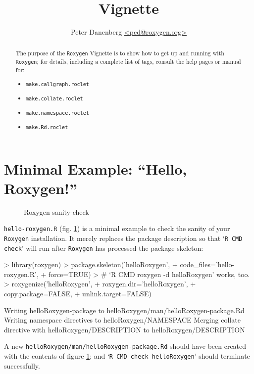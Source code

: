 \documentclass{article}
\author{Peter Danenberg \url{<pcd@roxygen.org>}}
\title{\Roxygen{} Vignette}
\newcommand{\Roxygen}{\texttt{Roxygen}}
\newcommand{\listing}[4]{        %
  \begin{figure}[H]              %
    \centering                   %
    \VerbatimInput[numbers=left, %
      frame=single,              %
      label=#2]{#1}              %
    \caption{#3}                 %
    \label{#4}                   %
  \end{figure}                   %
}
\begin{document}
\maketitle
\begin{abstract}
  The purpose of the \Roxygen{} Vignette is to show how to get up and
  running with \Roxygen{}; for details, including a complete list of
  tags, consult the help pages or manual for:
  \begin{itemize}
  \item \texttt{make.callgraph.roclet}
  \item \texttt{make.collate.roclet}
  \item \texttt{make.namespace.roclet}
  \item \texttt{make.Rd.roclet}
  \end{itemize}
\end{abstract}
\tableofcontents
\section{Minimal Example: ``Hello, Roxygen!''}

\listing{hello-roxygen.R}
        {hello-roxygen.R}
        {Roxygen sanity-check}
        {hello-roxygen}

\texttt{hello-roxygen.R} (fig. \ref{hello-roxygen}) is a minimal
example to check the sanity of your \Roxygen{} installation. It merely
replaces the package description so that `\texttt{R CMD check}' will
run after \Roxygen{} has processed the package skeleton:

\begin{Schunk}
\begin{Sinput}
> library(roxygen)
> package.skeleton('helloRoxygen',
+                  code_files='hello-roxygen.R',
+                  force=TRUE)
> # `R CMD roxygen -d helloRoxygen' works, too.
> roxygenize('helloRoxygen',
+            roxygen.dir='helloRoxygen',
+            copy.package=FALSE,
+            unlink.target=FALSE)
\end{Sinput}
\begin{Soutput}
Writing helloRoxygen-package to helloRoxygen/man/helloRoxygen-package.Rd
Writing namespace directives to helloRoxygen/NAMESPACE 
Merging collate directive with helloRoxygen/DESCRIPTION to helloRoxygen/DESCRIPTION 
\end{Soutput}
\end{Schunk}

A new \texttt{helloRoxygen/man/helloRoxygen-package.Rd} should have
been created with the contents of figure \ref{hello-roxygen}; and
`\texttt{R CMD check helloRoxygen}' should terminate successfully.
\end{document}

